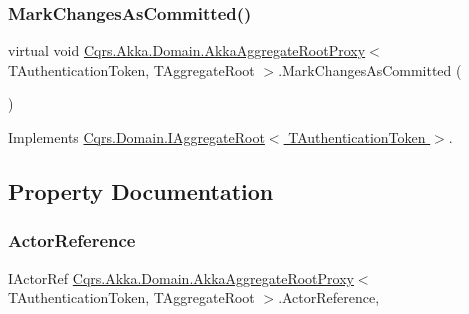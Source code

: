 \subsubsection{\texorpdfstring{Mark\+Changes\+As\+Committed()}{MarkChangesAsCommitted()}}
{\footnotesize\ttfamily virtual void \hyperlink{classCqrs_1_1Akka_1_1Domain_1_1AkkaAggregateRootProxy}{Cqrs.\+Akka.\+Domain.\+Akka\+Aggregate\+Root\+Proxy}$<$ T\+Authentication\+Token, T\+Aggregate\+Root $>$.Mark\+Changes\+As\+Committed (\begin{DoxyParamCaption}{ }\end{DoxyParamCaption})\hspace{0.3cm}{\ttfamily [virtual]}}



Implements \hyperlink{interfaceCqrs_1_1Domain_1_1IAggregateRoot_af31116870bbf6566b3eec0b8bc02c6de_af31116870bbf6566b3eec0b8bc02c6de}{Cqrs.\+Domain.\+I\+Aggregate\+Root$<$ T\+Authentication\+Token $>$}.



\subsection{Property Documentation}
\mbox{\label{classCqrs_1_1Akka_1_1Domain_1_1AkkaAggregateRootProxy_ad85e7a51c716484df8e5e8ea9ff31351_ad85e7a51c716484df8e5e8ea9ff31351}} 
\subsubsection{\texorpdfstring{Actor\+Reference}{ActorReference}}
{\footnotesize\ttfamily I\+Actor\+Ref \hyperlink{classCqrs_1_1Akka_1_1Domain_1_1AkkaAggregateRootProxy}{Cqrs.\+Akka.\+Domain.\+Akka\+Aggregate\+Root\+Proxy}$<$ T\+Authentication\+Token, T\+Aggregate\+Root $>$.Actor\+Reference\hspace{0.3cm}{\ttfamily [get]}, {\ttfamily [set]}}

\mbox{\label{classCqrs_1_1Akka_1_1Domain_1_1AkkaAggregateRootProxy_a45e41e24822f4a9a8077e10c153de163_a45e41e24822f4a9a8077e10c153de163}} 
